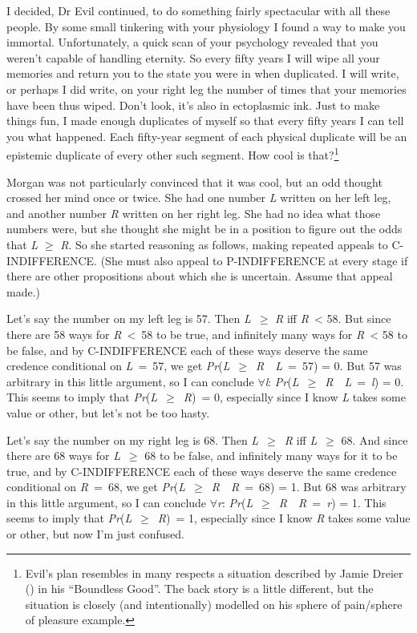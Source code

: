 \documentclass[
  10pt,
  letterpaper,
  DIV=11,
  numbers=noendperiod,
  twoside]{scrartcl}
\begin{document}
I decided, Dr Evil continued, to do something fairly spectacular with
all these people. By some small tinkering with your physiology I found a
way to make you immortal. Unfortunately, a quick scan of your psychology
revealed that you weren't capable of handling eternity. So every fifty
years I will wipe all your memories and return you to the state you were
in when duplicated. I will write, or perhaps I did write, on your right
leg the number of times that your memories have been thus wiped. Don't
look, it's also in ectoplasmic ink. Just to make things fun, I made
enough duplicates of myself so that every fifty years I can tell you
what happened. Each fifty-year segment of each physical duplicate will
be an epistemic duplicate of every other such segment. How cool is
that?\footnote{Evil's plan resembles in many respects a situation
  described by Jamie Dreier () in his
  ``Boundless Good''. The back story is a little different, but the
  situation is closely (and intentionally) modelled on his sphere of
  pain/sphere of pleasure example.}

Morgan was not particularly convinced that it was cool, but an odd
thought crossed her mind once or twice. She had one number \emph{L}
written on her left leg, and another number \emph{R} written on her
right leg. She had no idea what those numbers were, but she thought she
might be in a position to figure out the odds that \emph{L} \({\geq}\)
\emph{R}. So she started reasoning as follows, making repeated appeals
to C-INDIFFERENCE. (She must also appeal to P-INDIFFERENCE at every
stage if there are other propositions about which she is uncertain.
Assume that appeal made.)

Let's say the number on my left leg is 57. Then \emph{L}~\({\geq}\)
\emph{R} iff \emph{R}~\textless{} 58. But since there are 58 ways for
\emph{R}~\textless~58 to be true, and infinitely many ways for
\emph{R}~\textless{} 58 to be false, and by C-INDIFFERENCE each of these
ways deserve the same credence conditional on \emph{L}~=~57, we get
\emph{Pr}(\emph{L}~\({\geq}\)~\emph{R}~~\emph{L}~=~57) = 0. But 57 was
arbitrary in this little argument, so I can conclude
\({\forall}\)\emph{l}:
\emph{Pr}(\emph{L}~\({\geq}\)~\emph{R}~~\emph{L}~=~\emph{l}) = 0. This
seems to imply that \emph{Pr}(\emph{L}~\({\geq}\)~\emph{R})~= 0,
especially since I know \emph{L} takes some value or other, but let's
not be too hasty.

Let's say the number on my right leg is 68. Then
\emph{L}~\({\geq}\)~\emph{R} iff \emph{L}~\({\geq}\) 68. And since there
are 68 ways for \emph{L}~\({\geq}\) 68 to be false, and infinitely many
ways for it to be true, and by C-INDIFFERENCE each of these ways deserve
the same credence conditional on \emph{R}~=~68, we get
\emph{Pr}(\emph{L}~\({\geq}\)~\emph{R}~~\emph{R}~=~68) = 1. But 68 was
arbitrary in this little argument, so I can conclude
\({\forall}\)\emph{r}:
\emph{Pr}(\emph{L}~\({\geq}\)~\emph{R}~~\emph{R}~=~\emph{r}) = 1. This
seems to imply that \emph{Pr}(\emph{L}~\({\geq}\)~\emph{R})~= 1,
especially since I know \emph{R} takes some value or other, but now I'm
just confused.
\end{document}
